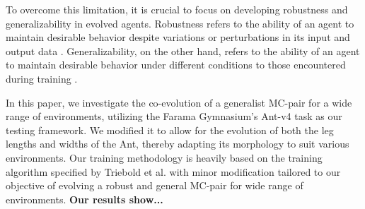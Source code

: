 To overcome this limitation, it is crucial to focus on developing robustness and generalizability in evolved agents. Robustness refers to the ability of an agent to maintain desirable behavior despite variations or perturbations in its input and output data \cite{Ravi_Mangal_2019, Charles_Packer_2019, Xu_Mengdi_2022}. Generalizability, on the other hand, refers to the ability of an agent to maintain desirable behavior under different conditions to those encountered during training \cite{Charles_Packer_2019,Xu_Mengdi_2022}. 

In this paper, we investigate the co-evolution of a generalist MC-pair for a wide range of environments, utilizing the Farama Gymnasium's Ant-v4 task \cite{Gymnasium2023} as our testing framework. We modified it to allow for the evolution of both the leg lengths and widths of the Ant, thereby adapting its morphology to suit various environments. Our training methodology is heavily based on the training algorithm specified by Triebold et al. \cite{Corinna_Triebold} with minor modification tailored to our objective of evolving a robust and general MC-pair for wide range of environments. \textbf{Our results show...}